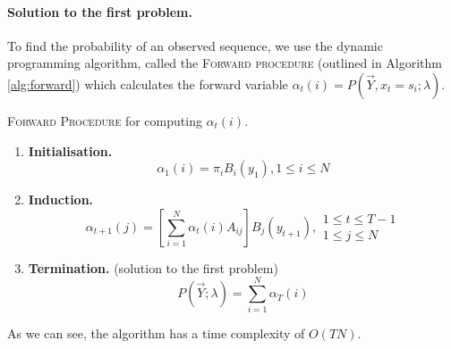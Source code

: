 	\paragraph{Solution to the first problem.}
	To find the probability of an observed sequence, we use the dynamic programming algorithm, called the \textsc{Forward procedure} (outlined in Algorithm \ref{alg:forward}) which calculates the forward variable $\alpha_t (i) = P(\vec Y, x_t = s_i; \lambda)$.
	\begin{algorithm}
		\caption{\textsc{Forward Procedure} for computing $\alpha_t(i)$.}
		\label{alg:forward}
		\begin{enumerate}
			\item
				\textbf{Initialisation.}
				$$\alpha_1(i) = \pi_i B_i(y_1), 1 \leq i \leq N$$
			\item
				\textbf{Induction.}
				\begin{equation*}
					\alpha_{t + 1}(j) = \left[ \sum_{i = 1}^N \alpha_t(i) A_{ij} \right] B_j (y_{t + 1}), 
					\begin{array}{lr}
						1 \leq t \leq T - 1\\
						1 \leq j \leq N
					\end{array}
				\end{equation*}
				
			\item
				\textbf{Termination.} (solution to the first problem)
				$$P\left(\vec Y; \lambda\right) = \sum_{i = 1}^N \alpha_T(i)$$
		\end{enumerate}
	\end{algorithm}
	As we can see, the algorithm has a time complexity of $O(TN)$.

